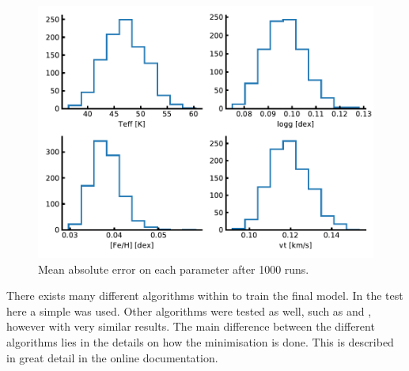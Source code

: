 \begin{figure}[htpb!]
    \centering
    \includegraphics[width=1.0\linewidth]{figures/ML.pdf}
    \caption{Mean absolute error on each parameter after 1000 runs.}
    \label{fig:ml}
\end{figure}

There exists many different algorithms within  to train the final model. In the
test here a simple  was used. Other algorithms were tested as well, such as
 and , however with very similar results. The main difference between the
different algorithms lies in the details on how the minimisation is done. This is described in great
detail in the online documentation.
